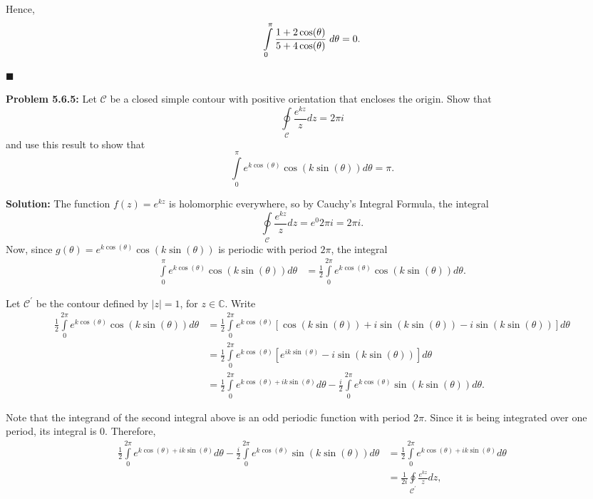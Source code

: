 \documentclass{article}
\newcommand{\mybox}{%
    \collectbox{%
        \setlength{\fboxsep}{1pt}%
        \fbox{\BOXCONTENT}%
    }%
}
\begin{document}
\noindent Hence, $$\int\limits_0^{\pi} \frac{1+2\cos(\theta)}{5+4\cos(\theta)} \hspace{1mm} d\theta = 0.$$

\hfill$\blacksquare$

\pagebreak

\noindent\mybox{\textbf{Problem 5.6.5:}}  Let $\mathscr{C}$ be a closed simple contour with positive orientation that encloses the origin.  Show that $$\oint\limits_{\mathscr{C}}\frac{e^{kz}}{z} dz = 2\pi i$$ and use this result to show that $$\int\limits_0^\pi e^{k\cos(\theta)}\cos(k\sin(\theta))d\theta = \pi.$$

\noindent\mybox{\textbf{Solution:}}  The function $f(z) = e^{kz}$ is holomorphic everywhere, so by Cauchy's Integral Formula, the integral $$\oint\limits_{\mathscr{C}} \frac{e^{kz}}{z} dz = e^{0}2\pi i = 2 \pi i.$$  Now, since $g(\theta) = e^{k\cos(\theta)}\cos(k\sin(\theta))$ is periodic with period $2\pi$, the integral
\begin{align}
\int\limits_0^{\pi}e^{k\cos(\theta)}\cos(k\sin(\theta)) d\theta &= \frac{1}{2}\int\limits_0^{2\pi}e^{k\cos(\theta)}\cos(k\sin(\theta)) d\theta.  
\end{align}

\noindent Let $\mathscr{C}^{\prime}$ be the contour defined by $|z| = 1$, for $z\in\mathbb{C}$.  Write 
\begin{align}
\frac{1}{2}\int\limits_0^{2\pi}e^{k\cos(\theta)}\cos(k\sin(\theta)) d\theta &= \frac{1}{2}\int\limits_0^{2\pi}e^{k\cos(\theta)}\left[\cos(k\sin(\theta)) + i\sin(k\sin(\theta)) - i\sin(k\sin(\theta))\right] d\theta \\
&= \frac{1}{2}\int\limits_0^{2\pi}e^{k\cos(\theta)}\left[e^{ik\sin(\theta)}-i\sin(k\sin(\theta))\right] d\theta \\
&= \frac{1}{2}\int\limits_0^{2\pi}e^{k\cos(\theta)+ik\sin(\theta)} d\theta - \frac{i}{2}\int\limits_0^{2\pi}e^{k\cos(\theta)}\sin(k\sin(\theta))d\theta.
\end{align}

\noindent Note that the integrand of the second integral above is an odd periodic function with period $2\pi$.  Since it is being integrated over one period, its integral is $0$.  Therefore,
\begin{align}
 \frac{1}{2}\int\limits_0^{2\pi}e^{k\cos(\theta)+ik\sin(\theta)} d\theta - \frac{i}{2}\int\limits_0^{2\pi}e^{k\cos(\theta)}\sin(k\sin(\theta))d\theta &=  \frac{1}{2}\int\limits_0^{2\pi}e^{k\cos(\theta)+ik\sin(\theta)} d\theta \\
 &= \frac{1}{2i}\oint\limits_{\mathscr{C}^{\prime}} \frac{e^{kz}}{z} dz,
\end{align}
\end{document}
